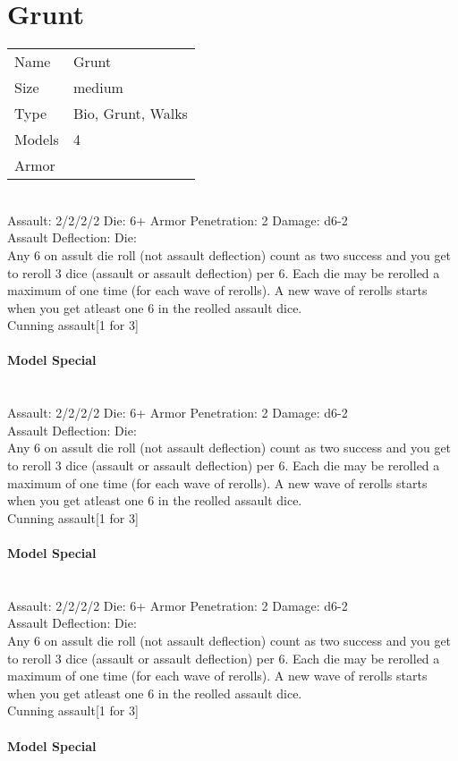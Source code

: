 \pagebreak

\section{ Grunt }

\begin{tabular}{ll}
  Name & Grunt \\
  Size & medium\\
  Type & Bio, Grunt, Walks\\
  Models & 4\\
  Armor & \\
\end{tabular}



\ \\
Assault: 2/2/2/2 Die: 6+ Armor Penetration: 2 Damage: d6-2 \\
Assault Deflection:  Die: \\
\indent Any 6 on assult die roll (not assault deflection) count as two success and you get to reroll 3 dice (assault or assault deflection) per 6. Each die may be rerolled a maximum of one time (for each wave of rerolls). A new wave of rerolls starts when you get atleast one 6 in the reolled assault dice.\\ Cunning assault[1 for 3] \\
\ \\
{\bf Model Special} \\

\ \\

\ \\
Assault: 2/2/2/2 Die: 6+ Armor Penetration: 2 Damage: d6-2 \\
Assault Deflection:  Die: \\
\indent Any 6 on assult die roll (not assault deflection) count as two success and you get to reroll 3 dice (assault or assault deflection) per 6. Each die may be rerolled a maximum of one time (for each wave of rerolls). A new wave of rerolls starts when you get atleast one 6 in the reolled assault dice.\\ Cunning assault[1 for 3] \\
\ \\
{\bf Model Special} \\

\ \\

\ \\
Assault: 2/2/2/2 Die: 6+ Armor Penetration: 2 Damage: d6-2 \\
Assault Deflection:  Die: \\
\indent Any 6 on assult die roll (not assault deflection) count as two success and you get to reroll 3 dice (assault or assault deflection) per 6. Each die may be rerolled a maximum of one time (for each wave of rerolls). A new wave of rerolls starts when you get atleast one 6 in the reolled assault dice.\\ Cunning assault[1 for 3] \\
\ \\
{\bf Model Special} \\

